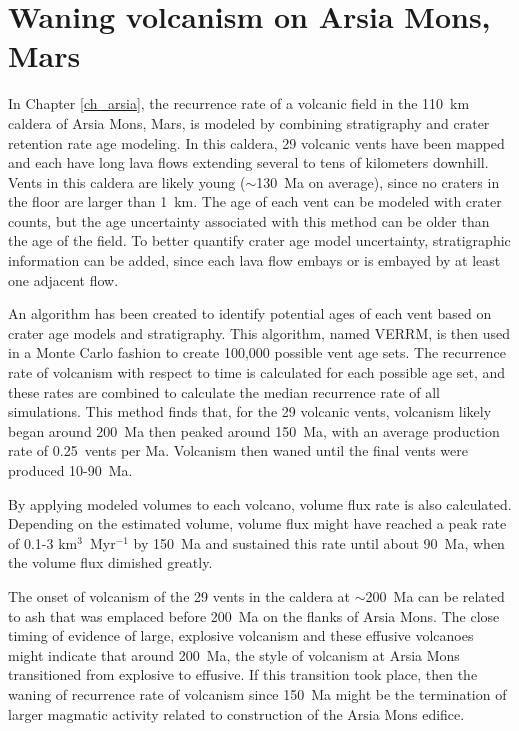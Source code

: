 \section{Waning volcanism on Arsia Mons, Mars}
In Chapter \ref{ch_arsia}, the recurrence rate of a volcanic field in the 110~km caldera of Arsia Mons, Mars, is modeled by combining stratigraphy and crater retention rate age modeling. In this caldera, 29 volcanic vents have been mapped and each have long lava flows extending several to tens of kilometers downhill. Vents in this caldera are likely young ($\sim$130~Ma on average), since no craters in the floor are larger than 1~km. The age of each vent can be modeled with crater counts, but the age uncertainty associated with this method can be older than the age of the field. To better quantify crater age model uncertainty, stratigraphic information can be added, since each lava flow embays or is embayed by at least one adjacent flow.

An algorithm has been created to identify potential ages of each vent based on crater age models and stratigraphy. This algorithm, named VERRM, is then used in a Monte Carlo fashion to create 100,000 possible vent age sets. The recurrence rate of volcanism with respect to time is calculated for each possible age set, and these rates are combined to calculate the median recurrence rate of all simulations. This method finds that, for the 29 volcanic vents, volcanism likely began around 200~Ma then peaked around 150~Ma, with an average production rate of 0.25~vents per Ma. Volcanism then waned until the final vents were produced 10-90~Ma.

By applying modeled volumes to each volcano, volume flux rate is also calculated. Depending on the estimated volume, volume flux might have reached a peak rate of 0.1-3 km$^3$~Myr$^{-1}$ by 150~Ma and sustained this rate until about 90~Ma, when the volume flux dimished greatly.

The onset of volcanism of the 29 vents in the caldera at $\sim$200~Ma can be related to ash that was emplaced before 200~Ma on the flanks of Arsia Mons. The close timing of evidence of large, explosive volcanism and these effusive volcanoes might indicate that around 200~Ma, the style of volcanism at Arsia Mons transitioned from explosive to effusive. If this transition took place, then the waning of recurrence rate of volcanism since 150~Ma might be the termination of larger magmatic activity related to construction of the Arsia Mons edifice.


